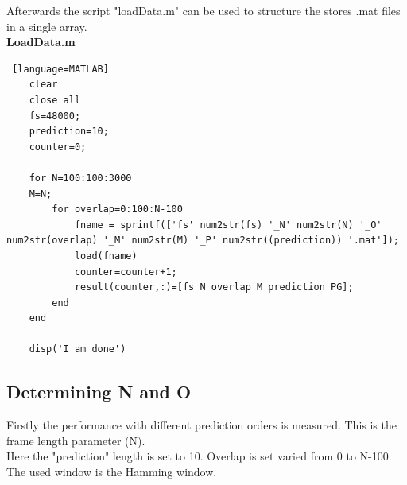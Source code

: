 Afterwards the script "loadData.m" can be used to structure the stores .mat  files in a single array.\\
\textbf{LoadData.m}
\begin{lstlisting} [language=MATLAB]
	clear
	close all
	fs=48000;
	prediction=10;
	counter=0;
	
	for N=100:100:3000
	M=N;
		for overlap=0:100:N-100
			fname = sprintf(['fs' num2str(fs) '_N' num2str(N) '_O' num2str(overlap) '_M' num2str(M) '_P' num2str((prediction)) '.mat']);
			load(fname)
			counter=counter+1;
			result(counter,:)=[fs N overlap M prediction PG]; 
		end
	end
	
	disp('I am done')
\end{lstlisting}

 
\subsection{Determining N and O}
Firstly the performance with different prediction orders is measured. This is the frame length parameter (N). \\ 
Here the "prediction" length is set to 10. Overlap is set varied from 0 to N-100. The used window is the Hamming window. 




